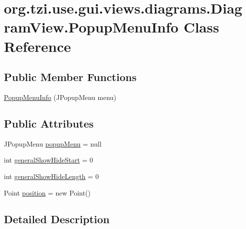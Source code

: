 \hypertarget{classorg_1_1tzi_1_1use_1_1gui_1_1views_1_1diagrams_1_1_diagram_view_1_1_popup_menu_info}{\section{org.\-tzi.\-use.\-gui.\-views.\-diagrams.\-Diagram\-View.\-Popup\-Menu\-Info Class Reference}
\label{classorg_1_1tzi_1_1use_1_1gui_1_1views_1_1diagrams_1_1_diagram_view_1_1_popup_menu_info}
}
\subsection*{Public Member Functions}
\begin{DoxyCompactItemize}
\item 
\hyperlink{classorg_1_1tzi_1_1use_1_1gui_1_1views_1_1diagrams_1_1_diagram_view_1_1_popup_menu_info_a8fe6a7d1f5ec612356e564c0ce75d316}{Popup\-Menu\-Info} (J\-Popup\-Menu menu)
\end{DoxyCompactItemize}
\subsection*{Public Attributes}
\begin{DoxyCompactItemize}
\item 
J\-Popup\-Menu \hyperlink{classorg_1_1tzi_1_1use_1_1gui_1_1views_1_1diagrams_1_1_diagram_view_1_1_popup_menu_info_a7a6d2ed536d8cc6e7b2034d7fadbbda0}{popup\-Menu} = null
\item 
int \hyperlink{classorg_1_1tzi_1_1use_1_1gui_1_1views_1_1diagrams_1_1_diagram_view_1_1_popup_menu_info_ae924e3e2f28f54f14a3e72bd6ef4dc2f}{general\-Show\-Hide\-Start} = 0
\item 
int \hyperlink{classorg_1_1tzi_1_1use_1_1gui_1_1views_1_1diagrams_1_1_diagram_view_1_1_popup_menu_info_a1cc892cc4b6b0eb0cb28cda62d2b03e5}{general\-Show\-Hide\-Length} = 0
\item 
Point \hyperlink{classorg_1_1tzi_1_1use_1_1gui_1_1views_1_1diagrams_1_1_diagram_view_1_1_popup_menu_info_aa81faab99f84257817e1964e5a0720c6}{position} = new Point()
\end{DoxyCompactItemize}


\subsection{Detailed Description}


